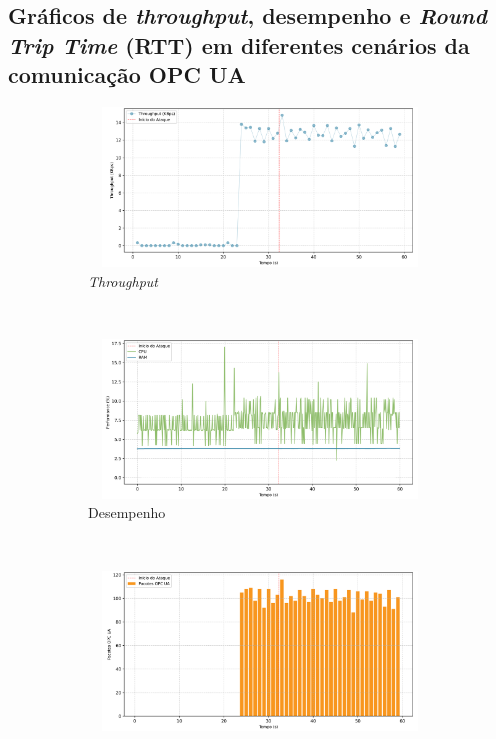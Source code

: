 
\begin{apendicesenv}

\partapendices

\chapter{Gráficos de \textit{throughput}, desempenho e \textit{Round Trip Time} (RTT) em diferentes cenários da comunicação OPC UA}

\begin{figure}[htbp!]
    \centering
    \begin{subfigure}[t]{0.5\textwidth}
        \centering
        \includegraphics[width=1\textwidth, height=120pt]{USPSC-img/output/cropped/0-dos_certificate_inf_chain_loop-tput.png}
        \caption{\textit{Throughput}}
    \end{subfigure}%
    ~ 
    \begin{subfigure}[t]{0.5\textwidth}
        \centering
        \includegraphics[width=1\textwidth, height=120pt]{USPSC-img/output/cropped/0-dos_certificate_inf_chain_loop-perf.png}
        \caption{Desempenho}
    \end{subfigure}%
    \\
    \begin{subfigure}[t]{0.5\textwidth}
        \centering
        \includegraphics[width=1\textwidth, height=120pt]{USPSC-img/output/cropped/0-dos_certificate_inf_chain_loop-pack.png}

\end{subfigure}
\end{figure}
\end{apendicesenv}
